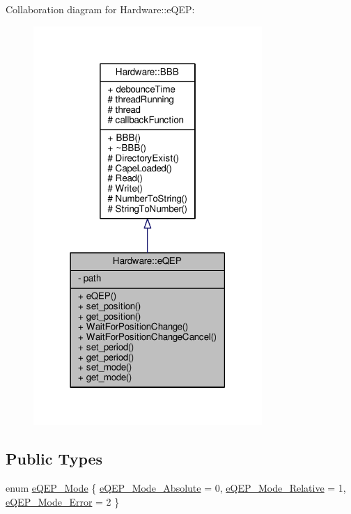 Collaboration diagram for Hardware\+:\+:e\+Q\+E\+P\+:\nopagebreak
\begin{figure}[H]
\begin{center}
\leavevmode
\includegraphics[width=246pt]{class_hardware_1_1e_q_e_p__coll__graph}
\end{center}
\end{figure}
\subsection*{Public Types}
\begin{DoxyCompactItemize}
\item 
enum \hyperlink{class_hardware_1_1e_q_e_p_a3f97f26c64d49d6f2643a257b7249070}{e\+Q\+E\+P\+\_\+\+Mode} \{ \hyperlink{class_hardware_1_1e_q_e_p_a3f97f26c64d49d6f2643a257b7249070a5e916ce9f21af5bd9c5c63609630df7e}{e\+Q\+E\+P\+\_\+\+Mode\+\_\+\+Absolute} = 0, 
\hyperlink{class_hardware_1_1e_q_e_p_a3f97f26c64d49d6f2643a257b7249070a66e4b97a79f9c26d25f2adb99638257e}{e\+Q\+E\+P\+\_\+\+Mode\+\_\+\+Relative} = 1, 
\hyperlink{class_hardware_1_1e_q_e_p_a3f97f26c64d49d6f2643a257b7249070a7456c9de6f190e0267c8e176ed739fad}{e\+Q\+E\+P\+\_\+\+Mode\+\_\+\+Error} = 2
 \}
\end{DoxyCompactItemize}
